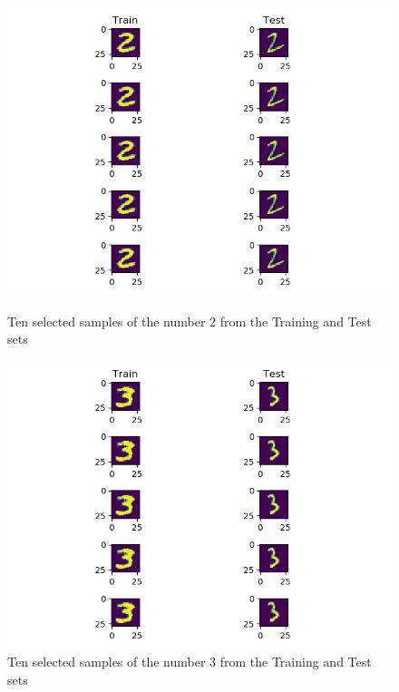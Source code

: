 \documentclass[10pt,letterpaper]{article}
\begin{document}
	\begin{figure}[H]
		\centering
		\includegraphics[width=\linewidth]{imgs/digit-2}
		\caption{Ten selected samples of the number 2 from the Training and Test sets}
		\label{fig:digit-2}
		\endminipage\hfill
		\centering
		\includegraphics[width=\linewidth]{imgs/digit-3}
		\caption{Ten selected samples of the number 3 from the Training and Test sets}
		\label{fig:digit-3}
		\endminipage\hfill
	\end{figure}
\end{document}
